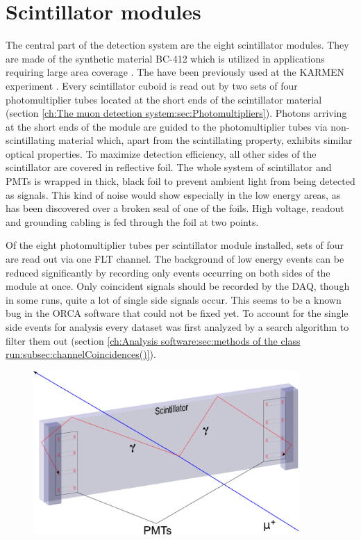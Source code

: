   \section{Scintillator modules}
  \label{ch:The muon detection system:sec:Scintillator modules}
  The central part of the detection system are the eight scintillator modules. They are made of the synthetic material BC-412 which is utilized in applications requiring large area coverage \cite{scintillatorManual}. The have been previously used at the KARMEN experiment \cite{reichenbacher}. Every scintillator cuboid is read out by two sets of four photomultiplier tubes located at the short ends of the scintillator material (section \ref{ch:The muon detection system:sec:Photomultipliers}). Photons arriving at the short ends of the module are guided to the photomultiplier tubes via non-scintillating material which, apart from the scintillating property, exhibits similar optical properties. To maximize detection efficiency, all other sides of the scintillator are covered in reflective foil. The whole system of scintillator and PMTs is wrapped in thick, black foil to prevent ambient light from being detected as signals. This kind of noise would show especially in the low energy areas, as has been discovered over a broken seal of one of the foils. High voltage, readout and grounding cabling is fed through the foil at two points.

  Of the eight photomultiplier tubes per scintillator module installed, sets of four are read out via one FLT channel. The background of low energy events can be reduced significantly by recording only events occurring on both sides of the module at once. Only coincident signals should be recorded by the DAQ, though in some runs, quite a lot of single side signals occur. This seems to be a known bug in the ORCA software that could not be fixed yet. To account for the single side events for analysis every dataset was first analyzed by a search algorithm to filter them out (section \ref{ch:Analysis software:sec:methods of the class run:subsec:channelCoincidences()}).
  

    \begin{figure}
    \centering
    \includegraphics[width = 0.9\textwidth]{graphics/muonModules/moduleDrawing.png}	
  \end{figure}
  
